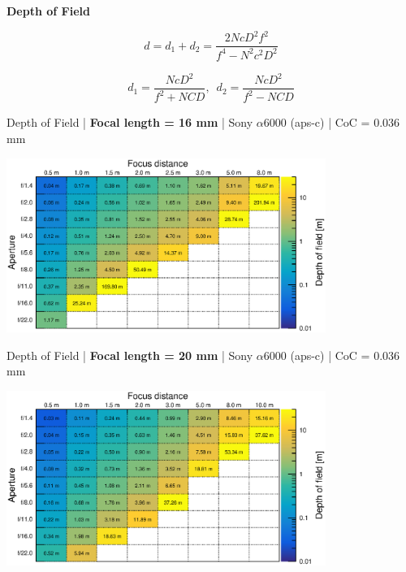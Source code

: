 \documentclass[aspectratio=169]{beamer}
\begin{document}

\begin{frame}[plain]{}
  \vspace{3ex}
  \begin{center} \LARGE \bf
    Depth of Field
  \end{center}

  {\Large 
    $$\mathit{d = d_1 + d_2 = \frac{2NcD^2f^2}{f^4 - N^2c^2D^2}}$$
  }

  \vspace{2ex}
  {\scriptsize
    $$\mathit{d_1 = \frac{NcD^2}{f^2 + NCD}}, \, \, \, \mathit{d_2 = \frac{NcD^2}{f^2 - NCD}}$$
  }

\end{frame}

\begin{frame}[plain]{}
  \vspace{1ex}
  \centering
  Depth of Field | {\bf Focal length = 16 mm} |  Sony $\alpha$\hspace{0.1em}6000 (aps-c) | CoC = 0.036 mm
  
  \includegraphics[center,width=0.78\textwidth]{img/depth-of-field_focl16.eps}
\end{frame}

\begin{frame}[plain]{}
  \vspace{1ex}
  \centering
  Depth of Field | {\bf Focal length = 20 mm} |  Sony $\alpha$\hspace{0.1em}6000 (aps-c) | CoC = 0.036 mm
  
  \includegraphics[center,width=0.78\textwidth]{img/depth-of-field_focl20.eps}
\end{frame}
\end{document}
